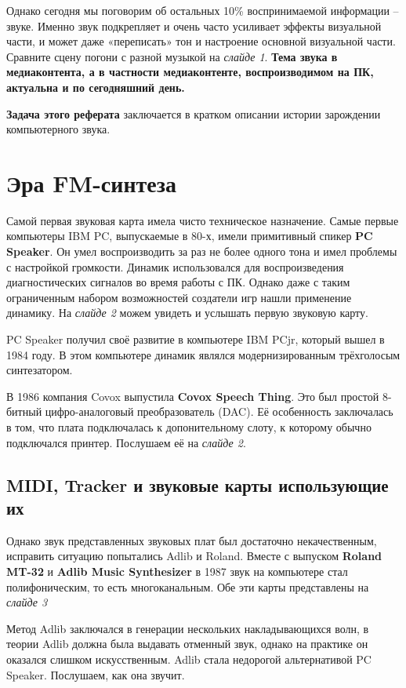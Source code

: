 \documentclass[a4paper,12pt]{extarticle}
\begin{document}
    Однако сегодня мы поговорим об остальных 10\% воспринимаемой информации – звуке. Именно звук подкрепляет и очень часто усиливает эффекты визуальной части, и может даже «переписать» тон и настроение основной визуальной части. Сравните сцену погони с разной музыкой на \textit{слайде 1}. \textbf{Тема звука в медиаконтента, а в частности медиаконтенте, воспроизводимом на ПК, актуальна и по сегодняшний день.}

    \textbf{Задача этого реферата} заключается в кратком описании истории зарождении компьютерного звука.
    \newpage


    \section{Эра FM-синтеза}
    Самой первая звуковая карта имела чисто техническое назначение. Самые первые компьютеры IBM PC, выпускаемые в 80-х, имели примитивный спикер \textbf{PC Speaker}. Он умел воспроизводить за раз не более одного тона и имел проблемы с настройкой громкости. Динамик использовался для воспроизведения диагностических сигналов во время работы с ПК. Однако даже с таким ограниченным набором возможностей создатели игр нашли применение динамику. На \textit{слайде 2} можем увидеть и услышать первую звуковую карту.

    PC Speaker получил своё развитие в компьютере IBM PCjr, который вышел в 1984 году. В этом компьютере динамик являлся модернизированным трёхголосым синтезатором.

    В 1986 компания Covox выпустила \textbf{Covox Speech Thing}. Это был простой 8-битный цифро-аналоговый преобразователь (DAC). Её особенность заключалась в том, что плата подключалась к допонительному слоту, к которому обычно подключался принтер. Послушаем её на \textit{слайде 2}.

    \subsection{MIDI, Tracker и звуковые карты использующие их}
    Однако звук представленных звуковых плат был достаточно некачественным, исправить ситуацию попытались Adlib и Roland. Вместе с выпуском \textbf{Roland MT-32} и \textbf{Adlib Music Synthesizer} в 1987 звук на компьютере стал полифоническим, то есть многоканальным. Обе эти карты представлены на \textit{слайде 3}

    Метод Adlib заключался в генерации нескольких накладывающихся волн, в теории Adlib должна была выдавать отменный звук, однако на практике он оказался слишком искусственным. Adlib стала недорогой альтернативой PC Speaker. Послушаем, как она звучит.
\end{document}
